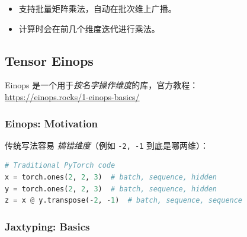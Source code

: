 
\begin{itemize}[leftmargin=1.5em]
    \item 支持批量矩阵乘法，自动在批次维上广播。
    \item 计算时会在前几个维度迭代进行乘法。
\end{itemize}

\clearpage
\subsection{Tensor Einops}
Einops 是一个用于\textit{按名字操作维度}的库，官方教程：\\
\url{https://einops.rocks/1-einops-basics/}

\subsubsection{Einops: Motivation}

传统写法容易 \emph{搞错维度}（例如 \verb|-2, -1| 到底是哪两维）：
\begin{lstlisting}[language=Python]
# Traditional PyTorch code
x = torch.ones(2, 2, 3)  # batch, sequence, hidden
y = torch.ones(2, 2, 3)  # batch, sequence, hidden
z = x @ y.transpose(-2, -1)  # batch, sequence, sequence
\end{lstlisting}




\subsubsection{Jaxtyping: Basics}

